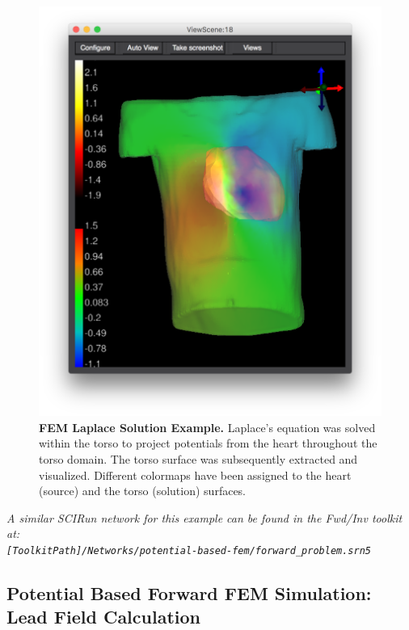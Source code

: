 \begin{figure}[H]
\vspace{-.25in}
\begin{center}
\includegraphics[width=\textwidth]{ECGToolkitGuide_figures/PotBasedFEM_LapSol.png}
\caption{{\bf FEM Laplace Solution Example.} Laplace's equation was solved within the torso to project potentials from the heart throughout the torso domain. The torso surface was subsequently extracted and visualized.  Different colormaps have been assigned to the heart (source) and the torso (solution) surfaces.}
\label{fig:PotBasedFEM_LapSol}
\end{center}
\vspace{-.25in}
\end{figure}

\textit{A similar SCIRun network for this example can be found in the Fwd/Inv toolkit at:\\{\tt [ToolkitPath]/Networks/potential-based-fem/forward\_problem.srn5}}

\subsection{Potential Based Forward FEM Simulation: Lead Field Calculation}

